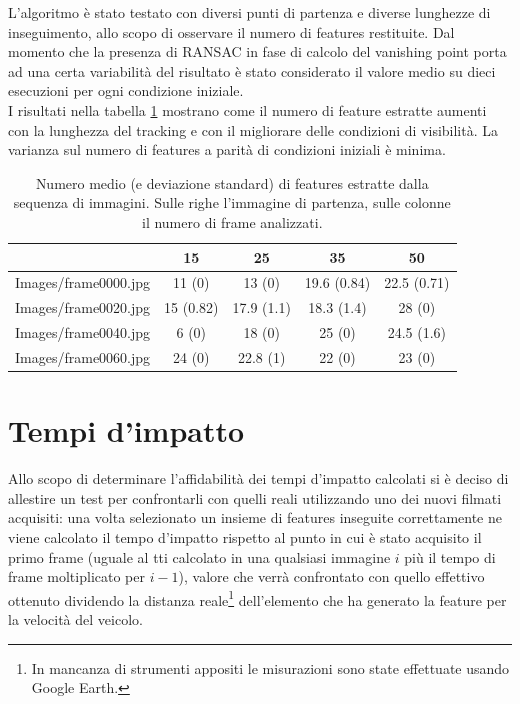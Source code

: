 \documentclass[12pt]{report}
\begin{document}
\noindent L'algoritmo \`e stato testato con diversi punti di partenza e diverse lunghezze di inseguimento, allo scopo di osservare il numero di features restituite. Dal momento che la presenza di RANSAC in fase di calcolo del vanishing point porta ad una certa variabilit\`a del risultato \`e stato considerato il valore medio su dieci esecuzioni per ogni condizione iniziale.\\
\noindent I risultati nella tabella \ref{tabNum} mostrano come il numero di feature estratte aumenti con la lunghezza del tracking e con il migliorare delle condizioni di visibilit\`a. La varianza sul numero di features a parit\`a di condizioni iniziali \`e minima.

\begin{table}[H]
\begin{center}
\begin{tabular}{|c|c|c|c|c|}
	\hline
	& 15 & 25 & 35 & 50 \\ \hline
	Images/frame0000.jpg & 11 (0) & 13 (0) & 19.6 (0.84) & 22.5 (0.71)\\ \hline
	Images/frame0020.jpg & 15 (0.82) & 17.9 (1.1) & 18.3 (1.4) & 28 (0)\\ \hline
	Images/frame0040.jpg & 6 (0) & 18 (0) & 25 (0) & 24.5 (1.6)\\ \hline
	Images/frame0060.jpg & 24 (0) & 22.8 (1) & 22 (0) & 23 (0)\\ \hline
\end{tabular}
\caption{Numero medio (e deviazione standard) di features estratte dalla sequenza di immagini. Sulle righe l'immagine di partenza, sulle colonne il numero di frame analizzati.}
\label{tabNum}
\end{center}
\end{table}



\newpage
\section{Tempi d'impatto}
\noindent Allo scopo di determinare l'affidabilit\`a dei tempi d'impatto calcolati si \`e deciso di allestire un test per confrontarli con quelli reali utilizzando uno dei nuovi filmati acquisiti: una volta selezionato un insieme di features inseguite correttamente ne viene calcolato il tempo d'impatto rispetto al punto in cui \`e stato acquisito il primo frame (uguale al tti calcolato in una qualsiasi immagine $i$ pi\`u il tempo di frame moltiplicato per $i-1$), valore che verr\`a confrontato con quello effettivo ottenuto dividendo la distanza reale\footnote{In mancanza di strumenti appositi le misurazioni sono state effettuate usando Google Earth.} dell'elemento che ha generato la feature per la velocit\`a del veicolo.\\
\end{document}
